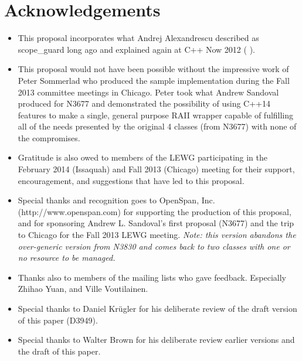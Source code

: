 \documentclass[ebook,11pt,article]{memoir}
\begin{document}
\chapter{Acknowledgements}
\begin{itemize}
\item This proposal incorporates what Andrej Alexandrescu described as scope_guard long ago and explained again at C++ Now 2012 (%
).
\item This proposal would not have been possible without the impressive work of Peter Sommerlad who produced the sample implementation during the Fall 2013 committee meetings in Chicago.  Peter took what Andrew Sandoval produced for N3677 and demonstrated the possibility of using C++14 features to make a single, general purpose RAII wrapper capable of fulfilling all of the needs presented by the original 4 classes (from N3677) with none of the compromises.
\item Gratitude is also owed to members of the LEWG participating in the February 2014 (Issaquah) and Fall 2013 (Chicago) meeting for their support, encouragement, and suggestions that have led to this proposal.
\item Special thanks and recognition goes to OpenSpan, Inc. (http://www.openspan.com) for supporting the production of this proposal, and for sponsoring Andrew L. Sandoval's first proposal (N3677) and the trip to Chicago for the Fall 2013 LEWG meeting. \emph{Note: this version abandons the over-generic version from N3830 and comes back to two classes with one or no resource to be managed.}
\item Thanks also to members of the mailing lists who gave feedback. Especially Zhihao Yuan, and Ville Voutilainen.
\item Special thanks to Daniel Kr\"ugler for his deliberate review of the draft version of this paper (D3949).
\item Special thanks to Walter Brown for his deliberate review earlier versions and the draft of this paper.
\end{itemize}
\end{document}
